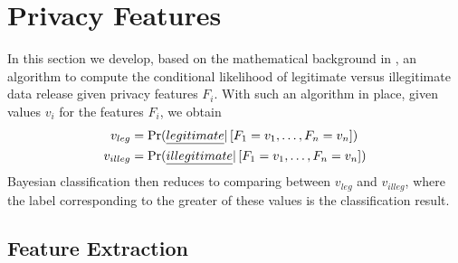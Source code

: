 \section{Privacy Features}\label{Se:algorithm}

In this section we develop, based on the mathematical background in , an algorithm to compute the conditional likelihood of legitimate versus illegitimate data release given privacy features $F_i$. With such an algorithm in place, given values $v_i$ for the features $F_i$, we obtain
\begin{align}
v_{leg} & = \Pr(\emph{legitimate} | \left[ F_1=v_1,\ldots,F_n=v_n \right]) \nonumber \\
v_{illeg} & = \Pr(\emph{illegitimate} | \left[ F_1=v_1,\ldots,F_n=v_n \right]) \nonumber
\end{align}
Bayesian classification then reduces to comparing between $v_{leg}$ and $v_{illeg}$, where the label corresponding to the greater of these values is the classification result.



\subsection{Feature Extraction}\label{Se:featext}

